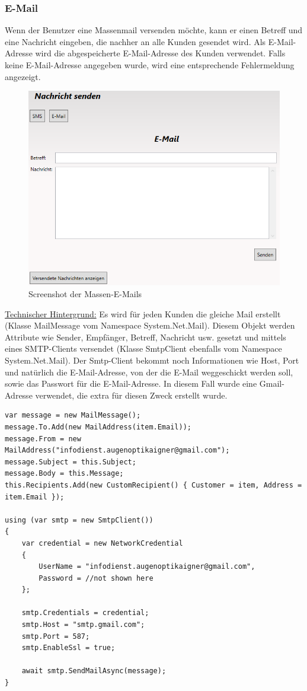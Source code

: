 \subsubsection{E-Mail}
Wenn der Benutzer eine Massenmail versenden möchte, kann er einen Betreff und eine Nachricht eingeben, die nachher an alle Kunden gesendet wird. Als E-Mail-Adresse wird die abgespeicherte E-Mail-Adresse des Kunden verwendet. Falls keine E-Mail-Adresse angegeben wurde, wird eine entsprechende Fehlermeldung angezeigt.
\newline
\begin{figure}[H]
\begin{center}
	\includegraphics[scale=.7]{images/Massenemail.png}
\end{center}
	\caption{Screenshot der Massen-E-Mails}
	\label{fig:sample}
\end{figure}
\noindent\underline{Technischer Hintergrund:}
\linebreak
Es wird für jeden Kunden die gleiche Mail erstellt (Klasse MailMessage vom Namespace System.Net.Mail). Diesem Objekt werden Attribute wie Sender, Empfänger, Betreff, Nachricht usw. gesetzt und mittels eines SMTP-Clients versendet (Klasse SmtpClient ebenfalls vom Namespace System.Net.Mail). Der Smtp-Client bekommt noch Informationen wie Host, Port und natürlich die E-Mail-Adresse, von der die E-Mail weggeschickt werden soll, sowie das Passwort für die E-Mail-Adresse. In diesem Fall wurde eine Gmail-Adresse verwendet, die extra für diesen Zweck erstellt wurde.
\begin{lstlisting}
var message = new MailMessage();
message.To.Add(new MailAddress(item.Email));
message.From = new MailAddress("infodienst.augenoptikaigner@gmail.com");
message.Subject = this.Subject;
message.Body = this.Message;
this.Recipients.Add(new CustomRecipient() { Customer = item, Address = item.Email });

using (var smtp = new SmtpClient())
{
	var credential = new NetworkCredential
	{
		UserName = "infodienst.augenoptikaigner@gmail.com",
		Password = //not shown here
	};
	
	smtp.Credentials = credential;
	smtp.Host = "smtp.gmail.com";
	smtp.Port = 587;
	smtp.EnableSsl = true;
	
	await smtp.SendMailAsync(message);
}       
\end{lstlisting}
